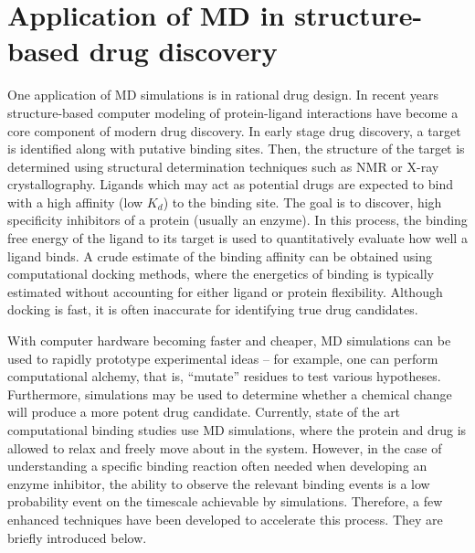 \section{Application of MD in structure-based drug discovery}



One application of MD simulations is in rational drug design. In recent years structure-based computer modeling of protein-ligand interactions have become a core component of modern drug discovery.  In early stage drug discovery, a target is identified along with putative binding sites.  Then, the structure of the target is determined using structural determination techniques such as NMR or X-ray crystallography.
Ligands which may act as potential drugs are expected to bind with a high affinity (low $K_d$) to the binding site. The goal is to discover,  high specificity inhibitors of a protein (usually an enzyme). In this process, the binding free energy of the ligand to its target is used to quantitatively evaluate how well a ligand binds. A crude estimate of the binding affinity can be obtained using computational docking methods, where the energetics of binding is typically estimated without accounting for either ligand or protein flexibility.  Although docking is fast, it is often inaccurate for identifying true drug candidates.

With computer hardware becoming faster and cheaper, MD simulations can be used to rapidly prototype experimental ideas -- for example, one can perform computational alchemy, that is, ``mutate'' residues to test various hypotheses. Furthermore, simulations may be used to determine whether a chemical change will produce a more potent drug candidate. Currently, state of the art computational binding studies use MD simulations, where the protein and drug is allowed to relax and freely move about in the system. However, in the case of understanding a specific binding reaction often needed when developing an enzyme inhibitor, the ability to observe the relevant binding events is a low probability event on the timescale achievable by simulations. Therefore, a few enhanced techniques have been developed to accelerate this process.  They are briefly introduced below.

